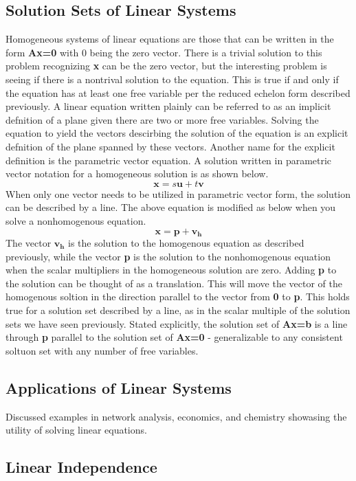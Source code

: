 \documentclass[12pt]{article}
\begin{document}
\subsection{Solution Sets of Linear Systems}
Homogeneous systems of linear equations are those that can be written in the form \textbf{Ax=0} with 0 being the zero vector. There is a trivial solution to this problem %
recognizing \textbf{x} can be the zero vector, but the interesting problem is seeing if there is a nontrival solution to the equation. This is true if and only if %
the equation has at least one free variable per the reduced echelon form described previously. 
\newline
\newline
A linear equation written plainly can be referred to as an implicit defnition of a plane given there are two or more free variables. Solving the equation to yield the vectors %
descirbing the solution of the equation is an explicit defnition of the plane spanned by these vectors. Another name for the explicit definition is the parametric vector%
 equation. A solution written in parametric vector notation for a homogeneous solution is as shown below.
\begin{equation}
     \mathbf{x} = s\mathbf{u}+t\mathbf{v}
\end{equation}
When only one vector needs to be utilized in parametric vector form, the solution can be described by a line. 
\newline
\newline
The above equation is modified as below when you solve a nonhomogenous equation.
\begin{equation}
    \mathbf{x} = \mathbf{p} + \mathbf{v_h}
\end{equation}
\newline
The vector $\mathbf{v_h}$ is the solution to the homogenous equation as described previously, while the vector \textbf{p} is the solution to the nonhomogenous equation when %
the scalar multipliers in the homogeneous solution are zero. Adding \textbf{p} to the solution can be thought of as a translation. This will move the vector of the homogenous %
soltion in the direction parallel to the vector from \textbf{0} to \textbf{p}. This holds true for a solution set described by a line, as in the scalar multiple of the %
solution sets we have seen previously. Stated explicitly, the solution set of \textbf{Ax=b} is a line through \textbf{p} parallel to the solution set of \textbf{Ax=0} - %
generalizable to any consistent soltuon set with any number of free variables.
\subsection{Applications of Linear Systems}
Discussed examples in network analysis, economics, and chemistry showasing the utility of solving linear equations. 
\subsection{Linear Independence}
\end{document}
